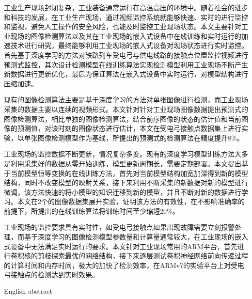 \begin{cabstract}
    工业生产现场封闭复杂，工业装备通常运行在高温高压的环境中。随着社会的进步和科技的发展，在工业生产现场，通过视频监控系统就能够快速、实时的进行监控和监视，避免人工操作的安全风险，也能及时监控工业现场状态。本文主要针对工业现场的图像检测算法以及其在工业现场的嵌入式设备中在线训练和实时运行的加速技术进行研究，最终能够利用工业现场的嵌入式设备对现场状态进行实时监控。首先基于深度学习的方法对铁路列车受电弓与供电线路的接触点位置监控视频进行预测式监控，其次设计检测模型在线训练算法实现检测模型利用工业现场不断产生新数据进行更新优化，最后为保证算法在嵌入式设备中实时运行，对模型结构进行压缩加速。
  
  现有的图像检测算法主要是基于深度学习的方法对单张图像进行检测，而工业现场采集的数据主要以连续的视频形式。本文针对针对工业现场图像数据提出预测式的图像检测算法，相比单独的图像检测算法，结合前序图像的状态的估计值和当前图像的预测值，对该时刻的图像状态进行估计，本文在受电弓接触点数据集上进行实验，以单张图像检测模型作为基线，所提出的预测式的检测算法在精度提升8\%。
  
  工业现场的监控数据不断更新，情况复杂多变。现有的深度学习模型训练方法大多是利用采集好的数据从零开始训练，模型更新周期长，需要定期部署。本文提出基于当前模型恒等变换的在线训练方法，首先对当前模型结构加宽加深得到新的模型结构，同时不改变模型的映射关系，接下来利用不断采集的新数据对新的模型进行微调，该方法快速的将小模型的知识迁移到新的模型，并且不断对新的数据进行学习。本文在2个的图像数据集展开实验，证明该方法的有效性，在不影响准确率的前提下，所提出的在线训练算法将训练时间至少缩短20\%。
  
  工业现场的监控要求具有实时性，如受电弓接触点如果出现故障需要立刻报警处理，而基于深度学习的图像检测模型参数量和计算量通常较大，在工业现场的嵌入式设备中无法满足实时运行的要求。本文针对工业现场常用的ARM平台，首先进行卷积核的剪枝探索最优的网络结构，接下来逐层测试卷积神经网络前向传递过程的计算时间和内存时间，极大的加快了检测效率，在ARMv7的实验平台上对受电弓接触点的检测达到实时效果。
  
\end{cabstract}


\begin{eabstract}

English abstract

\end{eabstract}

